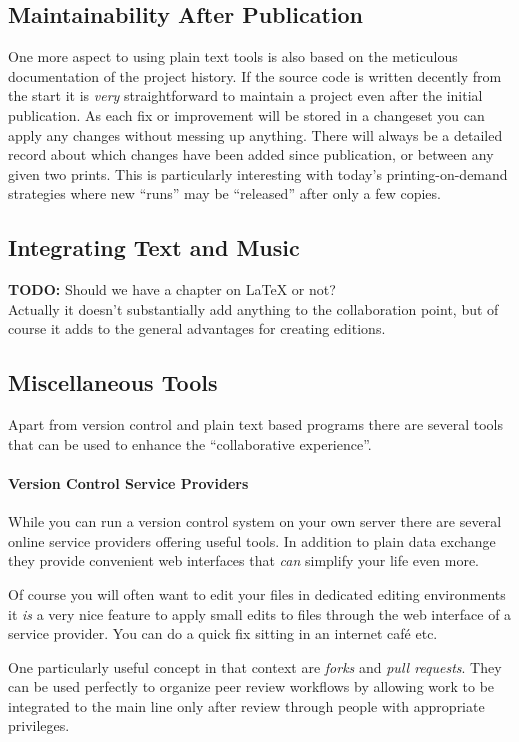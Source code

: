 \documentclass[11pt,a4paper]{article}
\begin{document}
\subsection{Maintainability After Publication}
One more aspect to using plain text tools is also based on the meticulous documentation
of the project history. If the source code is written decently from the start it is
\emph{very} straightforward to maintain a project even after the initial publication.
As each fix or improvement will be stored in a changeset you can apply any changes
without messing up anything. There will always be a detailed record about which
changes have been added since publication, or between any given two prints. This is
particularly interesting with today's printing-on-demand strategies where new “runs”
may be “released” after only a few copies.


\subsection{Integrating Text and Music}
\textbf{TODO:} Should we have a chapter on LaTeX or not?\\
Actually it doesn't substantially add anything to the collaboration point,
but of course it adds to the general advantages for creating editions.

\subsection{Miscellaneous Tools}
Apart from version control and plain text based programs there are several tools that
can be used to enhance the “collaborative experience”.

\paragraph{Version Control Service Providers}
While you can run a version control system on your own server there are several online service providers offering useful tools. In addition to plain data exchange they
provide convenient web interfaces that \emph{can} simplify your life even more.

Of course you will often want to edit your files in dedicated editing environments
it \emph{is} a very nice feature to apply small edits to files through the web interface
of a service provider. You can do a quick fix sitting in an internet café etc.

One particularly useful concept in that context are \emph{forks} and \emph{pull requests}.
They can be used perfectly to organize peer review workflows by allowing work to be
integrated to the main line only after review through people with appropriate privileges.
\end{document}
